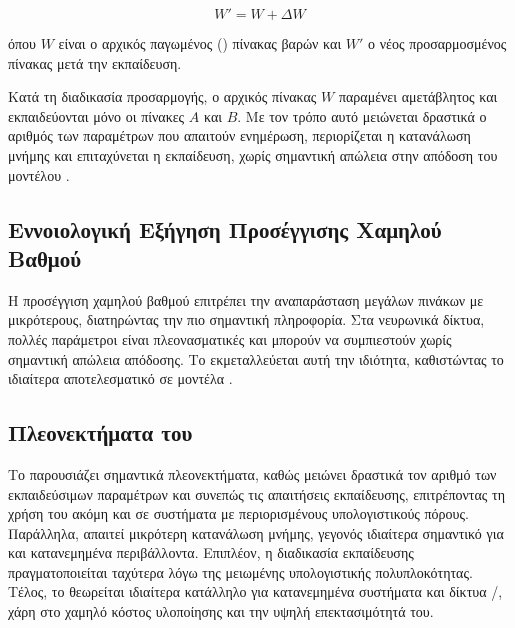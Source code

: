 \[
W' = W + \Delta W
\]

όπου \(W\) είναι ο αρχικός παγωμένος () πίνακας βαρών και \(W'\) ο νέος προσαρμοσμένος πίνακας μετά την εκπαίδευση.

Κατά τη διαδικασία προσαρμογής, ο αρχικός πίνακας \(W\) παραμένει αμετάβλητος και εκπαιδεύονται μόνο οι πίνακες \(A\) και \(B\). Με τον τρόπο αυτό μειώνεται δραστικά ο αριθμός των παραμέτρων που απαιτούν ενημέρωση, περιορίζεται η κατανάλωση μνήμης και επιταχύνεται η εκπαίδευση, χωρίς σημαντική απώλεια στην απόδοση του μοντέλου \cite{hu2021lora}.

\subsection{Εννοιολογική Εξήγηση Προσέγγισης Χαμηλού Βαθμού}

Η προσέγγιση χαμηλού βαθμού επιτρέπει την αναπαράσταση μεγάλων πινάκων με μικρότερους, διατηρώντας την πιο σημαντική πληροφορία. Στα νευρωνικά δίκτυα, πολλές παράμετροι είναι πλεονασματικές και μπορούν να συμπιεστούν χωρίς σημαντική απώλεια απόδοσης. Το  εκμεταλλεύεται αυτή την ιδιότητα, καθιστώντας το ιδιαίτερα αποτελεσματικό σε μοντέλα .

\subsection{Πλεονεκτήματα του }

Το  παρουσιάζει σημαντικά πλεονεκτήματα, καθώς μειώνει δραστικά τον αριθμό των εκπαιδεύσιμων παραμέτρων και συνεπώς τις απαιτήσεις εκπαίδευσης, επιτρέποντας τη χρήση του ακόμη και σε συστήματα με περιορισμένους υπολογιστικούς πόρους. Παράλληλα, απαιτεί μικρότερη κατανάλωση μνήμης, γεγονός ιδιαίτερα σημαντικό για  και κατανεμημένα περιβάλλοντα. Επιπλέον, η διαδικασία εκπαίδευσης πραγματοποιείται ταχύτερα λόγω της μειωμένης υπολογιστικής πολυπλοκότητας. Τέλος, το  θεωρείται ιδιαίτερα κατάλληλο για κατανεμημένα συστήματα και δίκτυα /, χάρη στο χαμηλό κόστος υλοποίησης και την υψηλή επεκτασιμότητά του.
